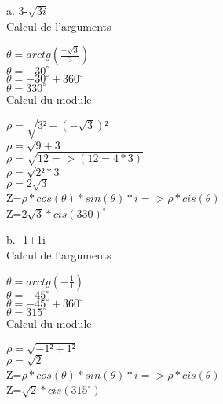 a. 3-$\sqrt{3i}$ \\

Calcul de l'arguments \\
\vspace{3mm} %

$\theta = arctg(\frac{-\sqrt{3}} {3})$ \\
$\theta = -30^{\circ}$ \\
$\theta = -30^{\circ} + 360^{\circ}$ \\
$\theta = 330^{\circ}$ \\

Calcul du module \\
\vspace{3mm} %

$\rho = \sqrt{3²+(-\sqrt{3})²}$ \\
$\rho = \sqrt{9+3}$ \\
$\rho = \sqrt{12 => (12=4*3)}$ \\
$\rho = \sqrt{2²*3}$ \\
$\rho = 2\sqrt{3}$ \\

Z=$\rho * cos(\theta)*sin(\theta)*i => \rho * cis(\theta)$ \\
Z=$ 2\sqrt{3} * cis(330)^{\circ} $ \\

\newpage

b.  -1+1i \\

Calcul de l'arguments \\
\vspace{3mm} %

$\theta = arctg(-\frac{1} {1})$ \\
$\theta = -45^{\circ}$ \\
$\theta = -45^{\circ} + 360^{\circ}$ \\
$\theta = 315^{\circ}$ \\

Calcul du module \\
\vspace{3mm} %

$\rho = \sqrt{-1²+1²}$ \\
$\rho = \sqrt{2}$ \\

Z=$\rho * cos(\theta)*sin(\theta)*i => \rho * cis(\theta)$ \\
Z=$ \sqrt{2} * cis(315^{\circ}) $ \\

